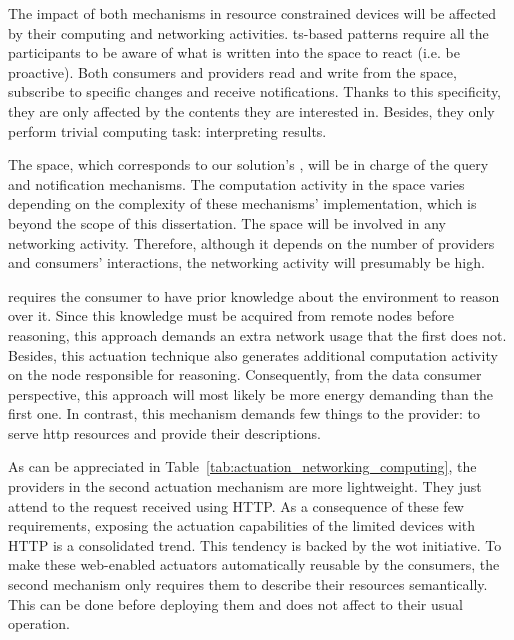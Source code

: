 


\bigskip

The impact of both mechanisms in resource constrained devices will be affected by their computing and networking activities.
\ac{ts}-based patterns require all the participants to be aware of what is written into the space to react (i.e. be proactive).
Both consumers and providers read and write from the space, subscribe to specific changes and receive notifications.
Thanks to this specificity, they are only affected by the contents they are interested in. %
Besides, they only perform trivial computing task: interpreting results. %


The space, which corresponds to our solution's \coordspace{}, will be in charge of the query and notification mechanisms.
The computation activity in the space varies depending on the complexity of these mechanisms' implementation, which is beyond the scope of this dissertation.
The space will be involved in any networking activity.
Therefore, although it depends on the number of providers and consumers' interactions, the networking activity will presumably be high.


\restActuation{} requires the consumer to have prior knowledge about the environment to reason over it. %
Since this knowledge must be acquired from remote nodes before reasoning, this approach demands an extra network usage that the first does not.
Besides, this actuation technique also generates additional computation activity on the node responsible for reasoning.
Consequently, from the data consumer perspective, this approach will most likely be more energy demanding than the first one. %
In contrast, this mechanism demands few things to the provider: to serve \ac{http} resources and provide their descriptions. %





\bigskip


As can be appreciated in Table~\ref{tab:actuation_networking_computing}, the providers in the second actuation mechanism are more lightweight.
They just attend to the request received using HTTP.
As a consequence of these few requirements, exposing the actuation capabilities of the limited devices with HTTP is a consolidated trend.
This tendency is backed by the \ac{wot} initiative.
To make these web-enabled actuators automatically reusable by the consumers, the second mechanism only requires them to describe their resources semantically.
This can be done before deploying them and does not affect to their usual operation.


